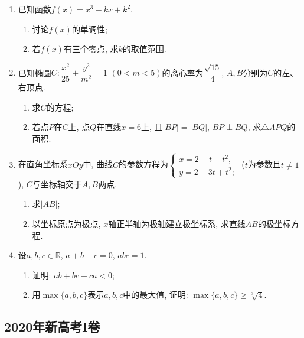 \begin{description}
\begin{enumerate}[leftmargin=5pt]
        \item 已知函数$f(x)=x^{3}-kx+k^{2}$.
        \begin{enumerate}[label=(\arabic*)]
            \item 讨论$f(x)$的单调性;
            \item 若$f(x)$有三个零点, 求$k$的取值范围.
        \end{enumerate}
        
        \item 已知椭圆$C:\dfrac{x^{2}}{25}+\dfrac{y^{2}}{m^{2}}=1$ $(0<m<5)$的离心率为$\dfrac{\sqrt{15}}{4}$, $A,B$分别为$C$的左、右顶点.
        \begin{enumerate}[label=(\arabic*)]
            \item 求$C$的方程;
            \item 若点$P$在$C$上, 点$Q$在直线$x=6$上, 且$|BP|=|BQ|$, $BP\perp BQ$, 求$\triangle APQ$的面积.
        \end{enumerate}
        
        \item 在直角坐标系$xOy$中, 曲线$C$的参数方程为$\begin{cases}x=2-t-t^{2},\\y=2-3t+t^{2};\end{cases}$ ($t$为参数且$t\neq 1$), $C$与坐标轴交于$A,B$两点.
        \begin{enumerate}[label=(\arabic*)]
            \item 求$|AB|$;
            \item 以坐标原点为极点, $x$轴正半轴为极轴建立极坐标系, 求直线$AB$的极坐标方程.
        \end{enumerate}
        
        \item 设$a,b,c\in\mathbb{R}$, $a+b+c=0$, $abc=1$.
        \begin{enumerate}[label=(\arabic*)]
            \item 证明: $ab+bc+ca<0$;
            \item 用$\max\{a,b,c\}$表示$a,b,c$中的最大值, 证明: $\max\{a,b,c\}\geqslant\sqrt[3]{4}$.
        \end{enumerate}
        
    \end{enumerate}
\end{description}
\clearpage


\subsection{2020年新高考I卷}\label{gk:2020年新高考I卷}


